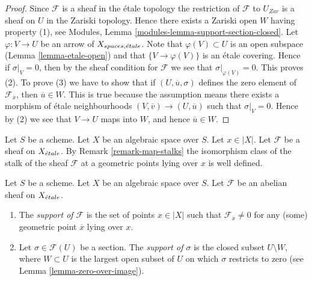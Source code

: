 \begin{proof}
Since $\mathcal{F}$ is a sheaf in the \'etale topology the restriction of
$\mathcal{F}$ to $U_{Zar}$ is a sheaf on $U$ in the Zariski topology.
Hence there exists a Zariski open $W$ having property (1), see
Modules, Lemma \ref{modules-lemma-support-section-closed}. Let
$\varphi : V \to U$ be an arrow of $X_{spaces, {\acute{e}tale}}$. Note that
$\varphi(V) \subset U$ is an open subspace
(Lemma \ref{lemma-etale-open})
and that $\{V \to \varphi(V)\}$ is an \'etale covering. Hence if
$\sigma|_V = 0$, then by the sheaf condition for $\mathcal{F}$ we
see that $\sigma|_{\varphi(V)} = 0$. This proves (2).
To prove (3) we have to show that if $(U, \overline{u}, \sigma)$
defines the zero element of $\mathcal{F}_{\overline{x}}$, then
$\overline{u} \in W$. This is true because the assumption means
there exists a morphism of \'etale neighbourhoods
$(V, \overline{v}) \to (U, \overline{u})$ such that
$\sigma|_V = 0$. Hence by (2) we see that $V \to U$ maps into $W$, and
hence $\overline{u} \in W$.
\end{proof}

\noindent
Let $S$ be a scheme.
Let $X$ be an algebraic space over $S$.
Let $x \in |X|$.
Let $\mathcal{F}$ be a sheaf on $X_{\acute{e}tale}$. By
Remark \ref{remark-map-stalks}
the isomorphism class of the stalk of the sheaf $\mathcal{F}$
at a geometric points lying over $x$ is well defined.

\begin{definition}
\label{definition-support}
Let $S$ be a scheme.
Let $X$ be an algebraic space over $S$.
Let $\mathcal{F}$ be an abelian sheaf on $X_{\acute{e}tale}$.
\begin{enumerate}
\item The {\it support of $\mathcal{F}$} is the set of
points $x \in |X|$ such that $\mathcal{F}_{\overline{x}} \not = 0$
for any (some) geometric point $\overline{x}$ lying over $x$.
\item Let $\sigma \in \mathcal{F}(U)$ be a section.
The {\it support of $\sigma$} is the closed subset $U \setminus W$, where
$W \subset U$ is the largest open subset of $U$ on which $\sigma$
restricts to zero (see
Lemma \ref{lemma-zero-over-image}).
\end{enumerate}
\end{definition}

